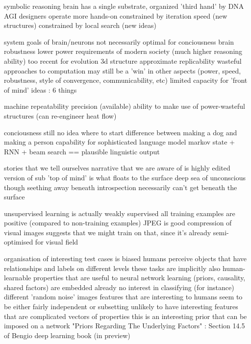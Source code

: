 \documentclass{llncs}
\begin{document}
  symbolic reasoning
    brain has a single substrate, organized 'third hand' by DNA
    AGI designers operate more hands-on
      constrained by iteration speed (new structures)
      constrained by local search (new ideas)


system goals of brain/neurons not necessarily optimal for conciousness
  brain 
    robustness
    lower power
    requirements of modern society (much higher reasoning ability) too recent for evolution
    3d structure
    approximate replicability
    wasteful approaches to computation may still be a 'win' in other aspects 
      (power, speed, robustness, style of convergence, communicability, etc)
    limited capacity for 'front of mind' ideas : 6 things
    
  machine
    repeatability
    precision (available)
    ability to make use of power-wasteful structures (can re-engineer heat flow)
    

conciousness 
  still no idea where to start
  difference between making a dog and making a person
    capability for sophisticated language model
      markov state + RNN + beam search == plausible linguistic output
  
  stories that we tell ourselves
    narrative that we are aware of is highly edited version of sub
      'top of mind' is what floats to the surface
      deep sea of unconscious though seething away beneath
  introspection necessarily can't get beneath the surface

unsupervised learning is actually weakly supervised 
  all training examples are positive (compared to non-training examples)
  JPEG is good compression of visual images
    suggests that we might train on that, since it's already semi-optimised for visual field

organisation of interesting test cases is biased
  humans perceive objects that have relationships and labels on different levels
    these tasks are implicitly also human-learnable
    properties that are useful to neural network learning (priors, causality, shared factors) are embedded already
  no interest in classifying (for instance) different 'random noise' images
  features that are interesting to humans seem to be either fairly independent or subsetting
    unlikely to have interesting features that are complicated vectors of properties
    this is an interesting prior that can be imposed on a network
      "Priors Regarding The Underlying Factors" : Section 14.5 of Bengio deep learning book (in preview) 
        \cite{Bengio-et-al-2014-Book} 
\end{document}

